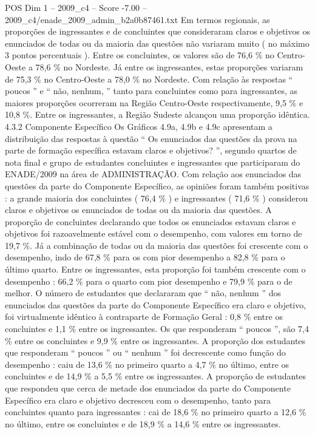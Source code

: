 \begin{textsample}{POS Dim 1 – 2009\_c4 – Score -7.00 – 2009\_c4/enade\_2009\_admin\_b2a0b87461.txt}
Em termos regionais, as proporções de ingressantes e de concluintes que consideraram claros e objetivos os enunciados de todas ou da maioria das questões não variaram muito ( no máximo 3 pontos percentuais ).
Entre os concluintes, os valores são de 76,6 \% no Centro-Oeste a 78,6 \% no Nordeste.
Já entre os ingressantes, estas proporções variaram de 75,3 \% no Centro-Oeste a 78,0 \% no Nordeste.
Com relação às respostas “ poucos ” e “ não, nenhum, ” tanto para concluintes como para ingressantes, as maiores proporções ocorreram na Região Centro-Oeste respectivamente, 9,5 \% e 10,8 \%.
Entre os ingressantes, a Região Sudeste alcançou uma proporção idêntica. 4.3.2 Componente Específico Os Gráficos 4.9a, 4.9b e 4.9c apresentam a distribuição das respostas à questão “ Os enunciados das questões da prova na parte de formação específica estavam claros e objetivos? ”, segundo quartos de nota final e grupo de estudantes concluintes e ingressantes que participaram do ENADE/2009 na área de ADMINISTRAÇÃO.
Com relação aos enunciados das questões da parte do Componente Específico, as opiniões foram também positivas : a grande maioria dos concluintes ( 76,4 \% ) e ingressantes ( 71,6 \% ) considerou claros e objetivos os enunciados de todas ou da maioria das questões.
A proporção de concluintes declarando que todos os enunciados estavam claros e objetivos foi razoavelmente estável com o desempenho, com valores em torno de 19,7 \%.
Já a combinação de todas ou da maioria das questões foi crescente com o desempenho, indo de 67,8 \% para os com pior desempenho a 82,8 \% para o último quarto.
Entre os ingressantes, esta proporção foi também crescente com o desempenho : 66,2 \% para o quarto com pior desempenho e 79,9 \% para o de melhor.
O número de estudantes que declararam que “ não, nenhum ” dos enunciados das questões da parte do Componente Específico era claro e objetivo, foi virtualmente idêntico à contraparte de Formação Geral : 0,8 \% entre os concluintes e 1,1 \% entre os ingressantes.
Os que responderam “ poucos ”, são 7,4 \% entre os concluintes e 9,9 \% entre os ingressantes.
A proporção dos estudantes que responderam “ poucos ” ou “ nenhum ” foi decrescente como função do desempenho : caiu de 13,6 \% no primeiro quarto a 4,7 \% no último, entre os concluintes e de 14,9 \% a 5,5 \% entre os ingressantes.
A proporção de estudantes que respondeu que cerca de metade dos enunciados da parte do Componente Específico era claro e objetivo decresceu com o desempenho, tanto para concluintes quanto para ingressantes : cai de 18,6 \% no primeiro quarto a 12,6 \% no último, entre os concluintes e de 18,9 \% a 14,6 \% entre os ingressantes.

\end{textsample}
